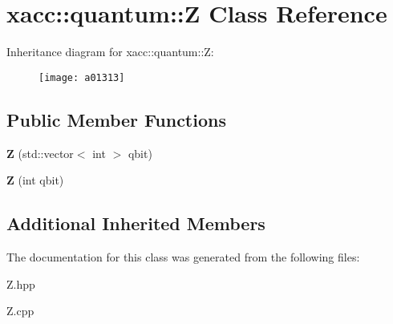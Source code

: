 \hypertarget{a01313}{}\section{xacc\+:\+:quantum\+:\+:Z Class Reference}
\label{a01313}
Inheritance diagram for xacc\+:\+:quantum\+:\+:Z\+:\begin{figure}[H]
\begin{center}
\leavevmode
\texttt{[image: a01313]}
\end{center}
\end{figure}
\subsection*{Public Member Functions}
\begin{DoxyCompactItemize}
\item 
\mbox{\label{a01313_a5f1d311b357faed8c2665fe20cf24aeb}} 
{\bfseries Z} (std\+::vector$<$ int $>$ qbit)
\item 
\mbox{\label{a01313_aa1bb7e533e7595e9ecd06879a2f8d2de}} 
{\bfseries Z} (int qbit)
\end{DoxyCompactItemize}
\subsection*{Additional Inherited Members}


The documentation for this class was generated from the following files\+:\begin{DoxyCompactItemize}
\item 
Z.\+hpp\item 
Z.\+cpp\end{DoxyCompactItemize}
